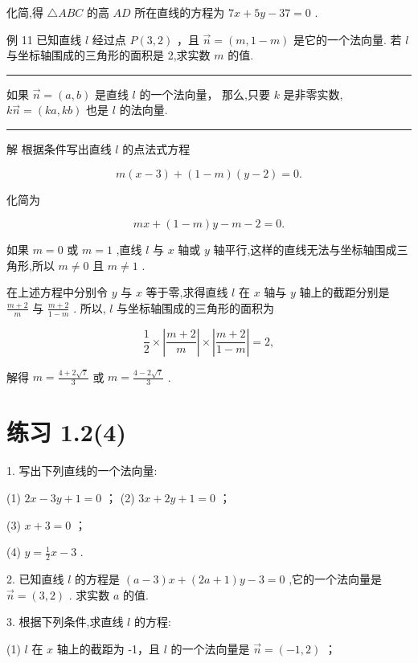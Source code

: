 \documentclass[10pt]{article}
\newcommand{\HRule}{\begin{center}\rule{0.9\linewidth}{0.2mm}\end{center}}
\begin{document}
化简,得 \(\bigtriangleup {ABC}\) 的高 \({AD}\) 所在直线的方程为 \({7x} + {5y} - {37} = 0\) .

例 11 已知直线 \(l\) 经过点 \(P\left( {3,2}\right)\) ，且 \(\overrightarrow{n} = \left( {m,1 - m}\right)\) 是它的一个法向量. 若 \(l\) 与坐标轴围成的三角形的面积是 2,求实数 \(m\) 的值.

\HRule

如果 \(\overrightarrow{n} = \left( {a,b}\right)\) 是直线 \(l\) 的一个法向量， 那么,只要 \(k\) 是非零实数, \(k\overrightarrow{n} = \left( {{ka},{kb}}\right)\) 也是 \(l\) 的法向量.

\HRule

解 根据条件写出直线 \(l\) 的点法式方程

\[
m\left( {x - 3}\right)  + \left( {1 - m}\right) \left( {y - 2}\right)  = 0.
\]

化简为

\[
{mx} + \left( {1 - m}\right) y - m - 2 = 0.
\]

如果 \(m = 0\) 或 \(m = 1\) ,直线 \(l\) 与 \(x\) 轴或 \(y\) 轴平行,这样的直线无法与坐标轴围成三角形,所以 \(m \neq  0\) 且 \(m \neq  1\) .

在上述方程中分别令 \(y\) 与 \(x\) 等于零,求得直线 \(l\) 在 \(x\) 轴与 \(y\) 轴上的截距分别是 \(\frac{m + 2}{m}\) 与 \(\frac{m + 2}{1 - m}\) . 所以, \(l\) 与坐标轴围成的三角形的面积为

\[
\frac{1}{2} \times  \left| \frac{m + 2}{m}\right|  \times  \left| \frac{m + 2}{1 - m}\right|  = 2,
\]

解得 \(m = \frac{4 + 2\sqrt{7}}{3}\) 或 \(m = \frac{4 - 2\sqrt{7}}{3}\) .

\section*{练习 1.2(4)}

1. 写出下列直线的一个法向量:

(1) \({2x} - {3y} + 1 = 0\) ； (2) \({3x} + {2y} + 1 = 0\) ；

(3) \(x + 3 = 0\) ；

(4) \(y = \frac{1}{2}x - 3\) .

2. 已知直线 \(l\) 的方程是 \(\left( {a - 3}\right) x + \left( {{2a} + 1}\right) y - 3 = 0\) ,它的一个法向量是 \(\overrightarrow{n} = \left( {3,2}\right)\) . 求实数 \(a\) 的值.

3. 根据下列条件,求直线 \(l\) 的方程:

(1) \(l\) 在 \(x\) 轴上的截距为 -1，且 \(l\) 的一个法向量是 \(\overrightarrow{n} = \left( {-1,2}\right)\) ；
\end{document}
